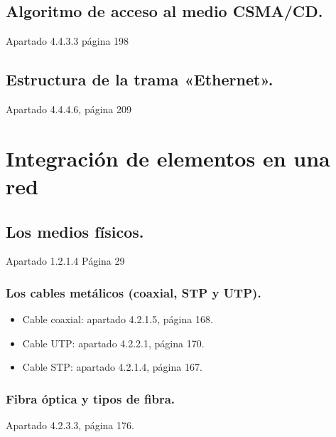 \documentclass[letterpaper,10pt,spanish]{sphinxmanual}
\begin{document}
\section{Algoritmo de acceso al medio CSMA/CD.}
\label{\detokenize{t1_caracterizacion_redes/apuntes_t1:algoritmo-de-acceso-al-medio-csma-cd}}
\sphinxAtStartPar
Apartado 4.4.3.3 página 198


\section{Estructura de la trama «Ethernet».}
\label{\detokenize{t1_caracterizacion_redes/apuntes_t1:estructura-de-la-trama-ethernet}}
\sphinxAtStartPar
Apartado 4.4.4.6, página 209


\chapter{Integración de elementos en una red}
\label{\detokenize{t2_integracion_elementos/apuntes_t2:integracion-de-elementos-en-una-red}}\label{\detokenize{t2_integracion_elementos/apuntes_t2::doc}}

\section{Los medios físicos.}
\label{\detokenize{t2_integracion_elementos/apuntes_t2:los-medios-fisicos}}
\sphinxAtStartPar
Apartado 1.2.1.4 Página 29


\subsection{Los cables metálicos (coaxial, STP y UTP).}
\label{\detokenize{t2_integracion_elementos/apuntes_t2:los-cables-metalicos-coaxial-stp-y-utp}}\begin{itemize}
\item {} 
\sphinxAtStartPar
Cable coaxial: apartado 4.2.1.5, página 168.

\item {} 
\sphinxAtStartPar
Cable UTP: apartado 4.2.2.1, página 170.

\item {} 
\sphinxAtStartPar
Cable STP: apartado 4.2.1.4, página 167.

\end{itemize}


\subsection{Fibra óptica y tipos de fibra.}
\label{\detokenize{t2_integracion_elementos/apuntes_t2:fibra-optica-y-tipos-de-fibra}}
\sphinxAtStartPar
Apartado 4.2.3.3, página 176.
\end{document}
